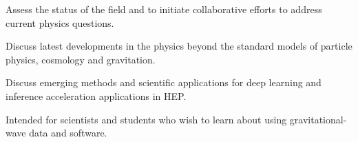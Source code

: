 { 
{Assess the status of the field and to initiate collaborative efforts to address current physics questions.}{} 


{ Discuss latest developments in the physics beyond the standard models of particle physics, cosmology and gravitation.}{}


{ Discuss emerging methods and scientific applications for deep learning and inference acceleration applications in HEP.}{}

{ Intended for scientists and students who wish to learn about using gravitational-wave data and software.}{}


}



